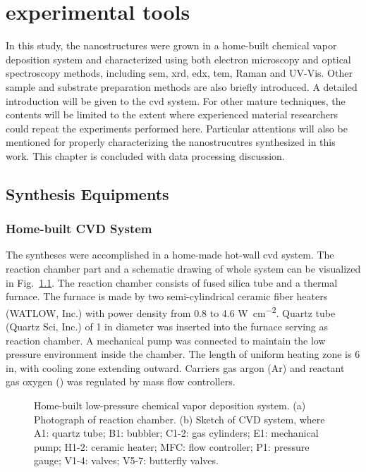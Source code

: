 
\chapter{experimental tools}

In this study, the nanostructures were grown in a home-built chemical vapor deposition system and characterized using both electron microscopy and optical spectroscopy methods, including \gls{sem}, \gls{xrd}, \gls{edx}, \gls{tem}, Raman and UV-Vis. Other sample and substrate preparation methods are also briefly introduced. A detailed introduction will be given to the \gls{cvd} system. For other mature techniques, the contents will be limited to the extent where experienced material researchers could repeat the experiments performed here. Particular attentions will also be mentioned for properly characterizing the nanostrucutres synthesized in this work. This chapter is concluded with data processing discussion. 

\section{Synthesis Equipments}
\subsection{Home-built CVD System}
The syntheses were accomplished in a home-made hot-wall \gls{cvd} system. The reaction chamber part and a schematic drawing of whole system can be visualized in Fig.~\ref{fig:ch2cvd}.  The reaction chamber consists of fused silica tube and a thermal furnace. The furnace is made by two semi-cylindrical ceramic fiber heaters (WATLOW, Inc.) with power density from 0.8 to 4.6 \si{W cm^{-2}}. Quartz tube (Quartz Sci, Inc.) of 1 in diameter was inserted into the furnace serving as reaction chamber. A mechanical pump was connected to maintain the low pressure environment inside the chamber. The length of uniform heating zone is 6 in, with cooling zone extending outward. Carriers gas argon (Ar) and reactant gas oxygen () was regulated by mass flow controllers.

\begin{figure}[htb]
\centering
{}

\caption[Home-built low-pressure chemical vapor deposition system]{Home-built low-pressure chemical vapor deposition system. (a) Photograph of reaction chamber. (b) Sketch of CVD system, where A1: quartz tube; B1: bubbler; C1-2: gas cylinders; E1: mechanical pump; H1-2: ceramic heater; MFC: flow controller; P1: pressure gauge; V1-4: valves; V5-7: butterfly valves.}
\label{fig:ch2cvd}
\end{figure}

